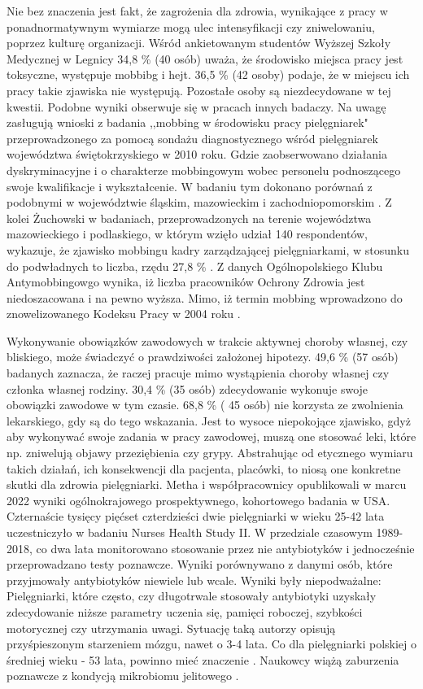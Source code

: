\documentclass[a4paper,12pt,twoside,openany]{report}
\begin{document}
Nie bez znaczenia jest fakt, że zagrożenia  dla zdrowia, wynikające z pracy w ponadnormatywnym wymiarze mogą ulec intensyfikacji czy zniwelowaniu, poprzez kulturę organizacji. Wśród ankietowanym studentów Wyższej Szkoły Medycznej w Legnicy 34,8 \% (40 osób) uważa, że środowisko miejsca pracy jest toksyczne, występuje mobbibg i hejt. 36,5 \% (42 osoby) podaje, że w miejscu ich pracy takie zjawiska nie występują. Pozostałe osoby są niezdecydowane w tej kwestii.  Podobne wyniki obserwuje się w pracach innych badaczy. Na uwagę zasługują wnioski z badania ,,mobbing w środowisku pracy pielęgniarek" przeprowadzonego za pomocą sondażu diagnostycznego wśród pielęgniarek województwa świętokrzyskiego w 2010 roku. Gdzie zaobserwowano działania dyskryminacyjne i o charakterze mobbingowym wobec personelu podnoszącego swoje kwalifikacje i wykształcenie. W badaniu tym dokonano porównań z podobnymi w województwie śląskim, mazowieckim i zachodniopomorskim \cite{mobbing}. Z kolei Żuchowski  w badaniach, przeprowadzonych na terenie województwa mazowieckiego i podlaskiego, w którym wzięło udział 140 respondentów, wykazuje, że zjawisko mobbingu kadry zarządzającej pielęgniarkami, w stosunku do podwładnych to liczba, rzędu 27,8 \% \cite{żuchowski}. Z danych Ogólnopolskiego Klubu Antymobbingowgo wynika, iż liczba pracowników Ochrony Zdrowia jest niedoszacowana i na pewno wyższa\cite{grabowski}.  Mimo, iż termin mobbing wprowadzono do znowelizowanego Kodeksu Pracy w 2004 roku \cite{kodeks}.


Wykonywanie obowiązków zawodowych w trakcie aktywnej choroby własnej, czy bliskiego, może świadczyć o prawdziwości założonej hipotezy. 49,6 \%  (57 osób) badanych zaznacza, że raczej pracuje mimo wystąpienia choroby własnej czy członka własnej rodziny. 30,4 \%  (35 osób) zdecydowanie wykonuje swoje obowiązki zawodowe w tym czasie. 68,8 \% ( 45 osób) nie korzysta ze zwolnienia lekarskiego, gdy są do tego wskazania. Jest to wysoce niepokojące zjawisko, gdyż aby wykonywać swoje zadania w pracy zawodowej, muszą one stosować leki, które np. zniwelują objawy przeziębienia czy grypy. Abstrahując od etycznego wymiaru takich działań,  ich konsekwencji dla pacjenta, placówki, to niosą one konkretne skutki dla zdrowia pielęgniarki.  Metha i współpracownicy opublikowali w marcu 2022 wyniki ogólnokrajowego prospektywnego, kohortowego badania  w USA. Czternaście tysięcy pięćset czterdzieści dwie  pielęgniarki w wieku 25-42 lata uczestniczyło w badaniu Nurses Health Study II.  W przedziale czasowym 1989- 2018, co dwa lata monitorowano stosowanie przez nie antybiotyków i jednocześnie przeprowadzano testy poznawcze. Wyniki porównywano z danymi osób, które przyjmowały antybiotyków niewiele lub wcale. Wyniki były niepodważalne: Pielęgniarki, które często, czy długotrwale stosowały antybiotyki uzyskały zdecydowanie niższe parametry uczenia się, pamięci roboczej, szybkości motorycznej czy utrzymania uwagi. Sytuację taką autorzy opisują przyśpieszonym starzeniem mózgu, nawet o 3-4 lata.  Co dla  pielęgniarki polskiej o średniej wieku - 53 lata, powinno mieć znaczenie \cite{statystyka}.  Naukowcy  wiążą zaburzenia poznawcze z  kondycją mikrobiomu jelitowego \cite{ metha}. 
\end{document}

